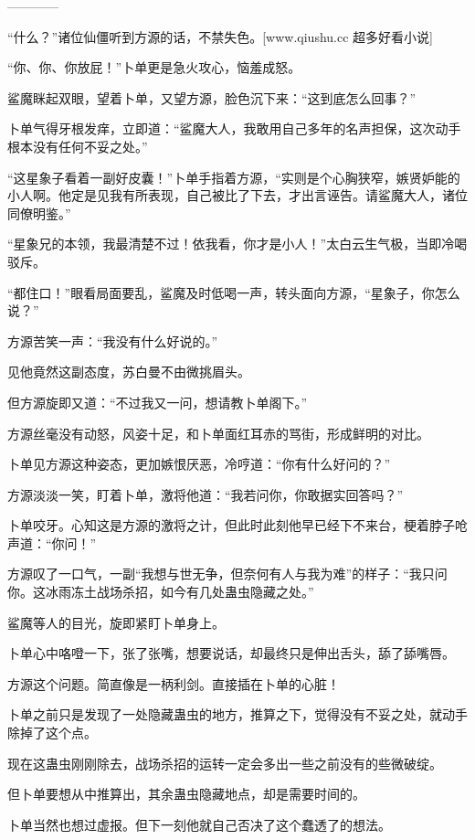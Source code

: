 
\begin{this_body}

------------

“什么？”诸位仙僵听到方源的话，不禁失色。[www.qiushu.cc 超多好看小说]

“你、你、你放屁！”卜单更是急火攻心，恼羞成怒。

鲨魔眯起双眼，望着卜单，又望方源，脸色沉下来：“这到底怎么回事？”

卜单气得牙根发痒，立即道：“鲨魔大人，我敢用自己多年的名声担保，这次动手根本没有任何不妥之处。”

“这星象子看着一副好皮囊！”卜单手指着方源，“实则是个心胸狭窄，嫉贤妒能的小人啊。他定是见我有所表现，自己被比了下去，才出言诬告。请鲨魔大人，诸位同僚明鉴。”

“星象兄的本领，我最清楚不过！依我看，你才是小人！”太白云生气极，当即冷喝驳斥。

“都住口！”眼看局面要乱，鲨魔及时低喝一声，转头面向方源，“星象子，你怎么说？”

方源苦笑一声：“我没有什么好说的。”

见他竟然这副态度，苏白曼不由微挑眉头。

但方源旋即又道：“不过我又一问，想请教卜单阁下。”

方源丝毫没有动怒，风姿十足，和卜单面红耳赤的骂街，形成鲜明的对比。

卜单见方源这种姿态，更加嫉恨厌恶，冷哼道：“你有什么好问的？”

方源淡淡一笑，盯着卜单，激将他道：“我若问你，你敢据实回答吗？”

卜单咬牙。心知这是方源的激将之计，但此时此刻他早已经下不来台，梗着脖子呛声道：“你问！”

方源叹了一口气，一副“我想与世无争，但奈何有人与我为难”的样子：“我只问你。这冰雨冻土战场杀招，如今有几处蛊虫隐藏之处。”

鲨魔等人的目光，旋即紧盯卜单身上。

卜单心中咯噔一下，张了张嘴，想要说话，却最终只是伸出舌头，舔了舔嘴唇。

方源这个问题。简直像是一柄利剑。直接插在卜单的心脏！

卜单之前只是发现了一处隐藏蛊虫的地方，推算之下，觉得没有不妥之处，就动手除掉了这个点。

现在这蛊虫刚刚除去，战场杀招的运转一定会多出一些之前没有的些微破绽。

但卜单要想从中推算出，其余蛊虫隐藏地点，却是需要时间的。

卜单当然也想过虚报。但下一刻他就自己否决了这个蠢透了的想法。


\end{this_body}
